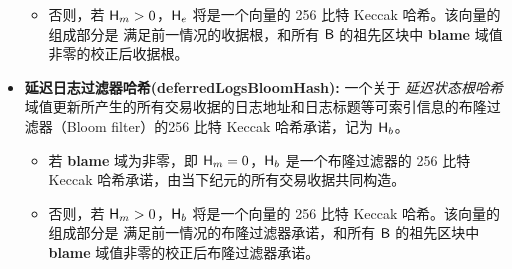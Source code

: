 \begin{itemize}[nosep]
\begin{itemize}
		\item 否则，若 $\textsf{H}_m>0$，$\textsf{H}_e$ 将是一个向量的 256 比特 Keccak 哈希。该向量的组成部分是 满足前一情况的收据根，和所有 $\textsf{B}$ 的祖先区块中 {\bf blame} 域值非零的校正后收据根。
	\end{itemize}
	
	
	\item {\bf 延迟日志过滤器哈希(deferredLogsBloomHash):} 一个关于 \emph{延迟状态根哈希} 域值更新所产生的所有交易收据的日志地址和日志标题等可索引信息的布隆过滤器（Bloom filter）的256 比特 Keccak 哈希承诺，记为 $\textsf{H}_b$。	
	\begin{itemize}
		\item 若 {\bf blame} 域为非零，即 $\textsf{H}_m=0$，$\textsf{H}_b$ 是一个布隆过滤器的 256 比特 Keccak 哈希承诺，由当下纪元的所有交易收据共同构造。
	
		\item 否则，若 $\textsf{H}_m>0$，$\textsf{H}_b$ 将是一个向量的 256 比特 Keccak 哈希。该向量的组成部分是 满足前一情况的布隆过滤器承诺，和所有 $\textsf{B}$ 的祖先区块中 {\bf blame} 域值非零的校正后布隆过滤器承诺。
	\end{itemize}


\end{itemize}

